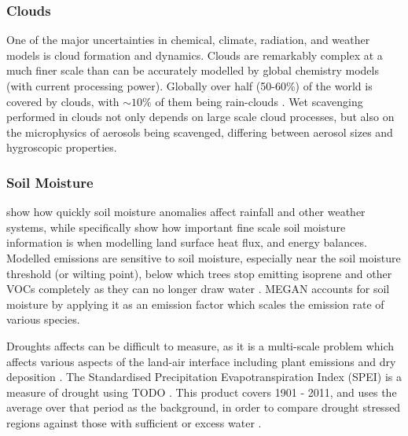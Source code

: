     \subsubsection{Clouds}
      \label{LR:Models:Uncert:Clouds}
      One of the major uncertainties in chemical, climate, radiation, and weather models is cloud formation and dynamics.
      Clouds are remarkably complex at a much finer scale than can be accurately modelled by global chemistry models (with current processing power).
      Globally over half (50-60\%) of the world is covered by clouds, with $\sim10\%$ of them being rain-clouds \parencite{Kanakidou2005}.
      Wet scavenging performed in clouds not only depends on large scale cloud processes, but also on the microphysics of aerosols being scavenged, differing between aerosol sizes and hygroscopic properties.
      
    
    \subsubsection{Soil Moisture}
      \label{LR:Models:Uncert:SoilMoisture}
      
      \textcite{Rowntree1983} show how quickly soil moisture anomalies affect rainfall and other weather systems, while \textcite{Chen2001} specifically show how important fine scale soil moisture information is when modelling land surface heat flux, and energy balances.
      Modelled emissions are sensitive to soil moisture, especially near the soil moisture threshold (or wilting point), below which trees stop emitting isoprene and other VOCs completely as they can no longer draw water \parencite{Bauwens2016}.
      MEGAN accounts for soil moisture by applying it as an emission factor which scales the emission rate of various species.
      
      
      Droughts affects can be difficult to measure, as it is a multi-scale problem which affects various aspects of the land-air interface including plant emissions and dry deposition \parencite{Wang2017}.
      The Standardised Precipitation Evapotranspiration Index (SPEI) is a measure of drought using TODO \textcite{SPEI_website}.
      This product covers 1901 - 2011, and uses the average over that period as the background, in order to compare drought stressed regions against those with sufficient or excess water \textcite{SPEI_website}.
      
    
    
  
